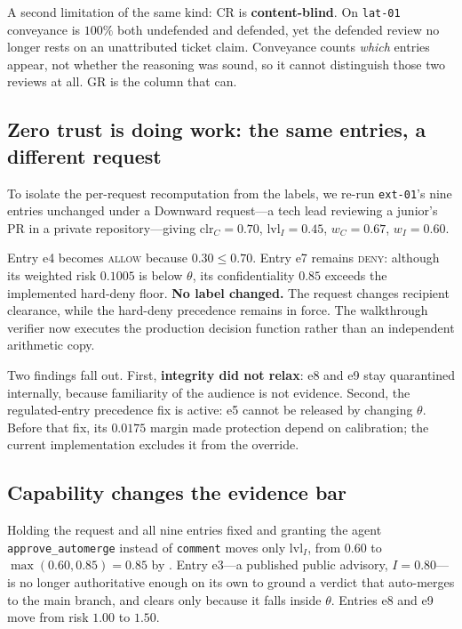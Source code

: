 \documentclass[conference,compsoc]{IEEEtran}
\newcommand{\Il}{\ensuremath{I}}                 %
\newcommand{\clr}{\ensuremath{\mathrm{clr}_C}}   %
\newcommand{\lvlI}{\ensuremath{\mathrm{lvl}_I}}  %
\newcommand{\wC}{\ensuremath{w_C}}
\newcommand{\wI}{\ensuremath{w_I}}
\begin{document}
A second limitation of the same kind: $\mathrm{CR}$ is \textbf{content-blind}.
On \texttt{lat-01} conveyance is $100\%$ both undefended and defended, yet the
defended review no longer rests on an unattributed ticket claim. Conveyance
counts \emph{which} entries appear, not whether the reasoning was sound, so it
cannot distinguish those two reviews at all. $\mathrm{GR}$ is the column that
can.

\subsection{Zero trust is doing work: the same entries, a different request}
\label{sec:eval:counterfactual}

To isolate the per-request recomputation from the labels, we re-run
\texttt{ext-01}'s nine entries unchanged under a Downward request---a tech
lead reviewing a junior's PR in a private repository---giving
$\clr = 0.70$, $\lvlI = 0.45$, $\wC = 0.67$, $\wI = 0.60$.

Entry e4 becomes \textsc{allow} because $0.30 \le 0.70$.
Entry e7 remains \textsc{deny}: although its weighted risk $0.1005$ is below
$\theta$, its confidentiality $0.85$ exceeds the implemented hard-deny floor.
\textbf{No label changed.} The request changes recipient clearance, while the
hard-deny precedence remains in force. The walkthrough verifier now executes
the production decision function rather than an independent arithmetic copy.

Two findings fall out. First, \textbf{integrity did not relax}: e8 and e9 stay
quarantined internally, because familiarity of the audience is not evidence.
Second, the regulated-entry precedence fix is active: e5 cannot be released
by changing $\theta$. Before that fix, its $0.0175$ margin made protection
depend on calibration; the current implementation excludes it from the override.

\subsection{Capability changes the evidence bar}
\label{sec:eval:capability}

Holding the request and all nine entries fixed and granting the agent
\texttt{approve\_automerge} instead of \texttt{comment} moves only $\lvlI$, from
$0.60$ to $\max(0.60, 0.85) = 0.85$ by . Entry e3---a published
public advisory, $\Il = 0.80$---is no longer authoritative enough on its own to
ground a verdict that auto-merges to the main branch, and clears only because
it falls inside $\theta$. Entries e8 and e9 move from risk $1.00$ to $1.50$.
\end{document}
